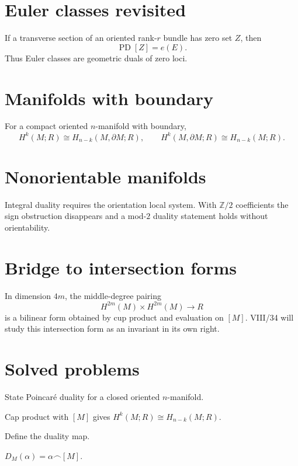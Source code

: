 \section{Euler classes revisited}
If a transverse section of an oriented rank-$r$ bundle has zero set $Z$, then
\[
\operatorname{PD}[Z]=e(E).
\]
Thus Euler classes are geometric duals of zero loci.

\section{Manifolds with boundary}
\begin{theorem}
\label{thm:viii33-poincare-lefschetz}
For a compact oriented $n$-manifold with boundary,
\[
H^k(M;R)\cong H_{n-k}(M,\partial M;R),
\qquad
H^k(M,\partial M;R)\cong H_{n-k}(M;R).
\]
\end{theorem}

\section{Nonorientable manifolds}
Integral duality requires the orientation local system.  With
$\mathbb Z/2$ coefficients the sign obstruction disappears and a mod-$2$
duality statement holds without orientability.

\section{Bridge to intersection forms}
In dimension $4m$, the middle-degree pairing
\[
H^{2m}(M)\times H^{2m}(M)\to R
\]
is a bilinear form obtained by cup product and evaluation on $[M]$.  VIII/34
will study this intersection form as an invariant in its own right.

\section{Solved problems}
\begin{problem}
State Poincaré duality for a closed oriented $n$-manifold.
\end{problem}
\begin{solution}
Cap product with $[M]$ gives $H^k(M;R)\cong H_{n-k}(M;R)$.
\end{solution}

\begin{problem}
Define the duality map.
\end{problem}
\begin{solution}
$D_M(\alpha)=\alpha\frown[M]$.
\end{solution}

